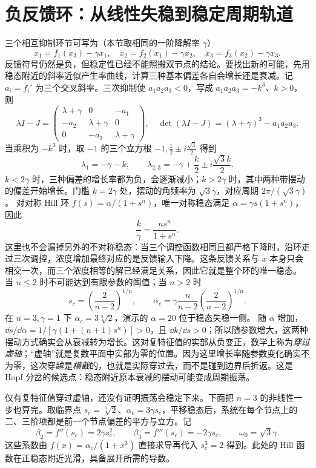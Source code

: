\section{负反馈环：从线性失稳到稳定周期轨道}
三个相互抑制环节可写为（本节取相同的一阶降解率 $\gamma$）
\begin{equation}\dot x_1=f_1(x_3)-\gamma x_1,\quad\dot x_2=f_2(x_1)-\gamma x_2,\quad\dot x_3=f_3(x_2)-\gamma x_3.\end{equation}
反馈符号仍然是负，但稳定性已经不能照搬双节点的结论。要找出新的可能，先用稳态附近的斜率近似产生率曲线，计算三种基本偏差各自会增长还是衰减。记 $a_i=f_i'$ 为三个交叉斜率。三次抑制使 $a_1a_2a_3<0$，写成 $a_1a_2a_3=-k^3$、$k>0$，则
\[
\lambda I-J=\begin{pmatrix}\lambda+\gamma&0&-a_1\\-a_2&\lambda+\gamma&0\\0&-a_3&\lambda+\gamma\end{pmatrix},
\quad \det(\lambda I-J)=(\lambda+\gamma)^3-a_1a_2a_3.
\]
当乘积为 $-k^3$ 时，取 $-1$ 的三个立方根 $-1,\frac12\pm i\frac{\sqrt3}{2}$ 得到
\[
\lambda_1=-\gamma-k,\qquad\lambda_{2,3}=-\gamma+\frac k2\pm i\frac{\sqrt3k}{2}.
\]
$k<2\gamma$ 时，三种偏差的增长率都为负，会逐渐减小；$k>2\gamma$ 时，其中两种带摆动的偏差开始增长。门槛 $k=2\gamma$ 处，摆动的角频率为 $\sqrt3\gamma$，对应周期 $2\pi/(\sqrt3\gamma)$。
对对称 Hill 环 $f(s)=\alpha/(1+s^n)$，唯一对称稳态满足 $\alpha=\gamma s(1+s^n)$，因此
\[
\frac k\gamma=\frac{ns^n}{1+s^n}.
\]
这里也不会漏掉另外的不对称稳态：当三个调控函数相同且都严格下降时，沿环走过三次调控，浓度增加最终对应的是反馈输入下降。这条反馈关系与 $x$ 本身只会相交一次，而三个浓度相等的解已经满足关系，因此它就是整个环的唯一稳态。
当 $n\leq2$ 时不可能达到有限参数的阈值；当 $n>2$ 时
\[
s_c=\left(\frac2{n-2}\right)^{1/n},\qquad
\alpha_c=\gamma\frac n{n-2}\left(\frac2{n-2}\right)^{1/n}.
\]
在 $n=3,\gamma=1$ 下 $\alpha_c=3\sqrt[3]2$，演示的 $\alpha=20$ 位于稳态失稳一侧。
随 $\alpha$ 增加，$\dd s/\dd\alpha=1/[\gamma(1+(n+1)s^n)]>0$，且 $\dd k/\dd s>0$；所以随参数增大，这两种摆动方式确实会从衰减转为增长。这对复特征值的实部从负变正，数学上称为\emph{穿过虚轴}；“虚轴”就是复数平面中实部为零的位置。因为这里增长率随参数变化确实不为零，这次穿越是\emph{横截}的，也就是实际穿过去，而不是碰到边界后折返。这是 Hopf 分岔的候选点：稳态附近原本衰减的摆动可能变成周期振荡。

仅有复特征值穿过虚轴，还没有证明振荡会稳定下来。下面把 $n=3$ 的非线性一步也算完。取临界点 $s_c=\sqrt[3]2$、$\alpha_c=3\gamma s_c$，平移稳态后，系统在每个节点上的二、三阶项都是前一个节点偏差的平方与立方。记
\[
\beta_2=f''(s_c)=2\gamma s_c^2,\qquad
\beta_3=f'''(s_c)=-2\gamma s_c,\qquad
\omega_0=\sqrt3\gamma.
\]
这些系数由 $f(x)=\alpha_c/(1+x^3)$ 直接求导再代入 $s_c^3=2$ 得到。此处的 Hill 函数在正稳态附近光滑，具备展开所需的导数。

